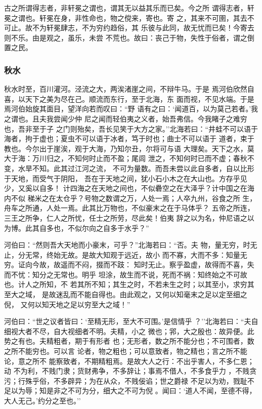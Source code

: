 \documentclass[]{article}
\begin{document}
古之所谓得志者，非轩冕之谓也，谓其无以益其乐而已矣。今之所
谓得志者，轩冕之谓也。轩冕在身，非性命也，物之傥来，寄也。寄
之，其来不可圉，其去不可止。故不为轩冕肆志，不为穷约趋俗，其
乐彼与此同，故无忧而已矣！今寄去则不乐。由是观之，虽乐，未尝
不荒也。故曰：丧己于物，失性于俗者，谓之倒置之民。

\hypertarget{header-n2197}{%
\subsubsection{秋水}\label{header-n2197}}

秋水时至，百川灌河。泾流之大，两涘渚崖之间，不辩牛马。于是
焉河伯欣然自喜，以天下之美为尽在己。顺流而东行，至于北海，东
面而视，不见水端。于是焉河伯始旋其面目，望洋向若而叹曰：``野
语有之曰：`闻道百，以为莫己若者。'我之谓也。且夫我尝闻少仲
尼之闻而轻伯夷之义者，始吾弗信。今我睹子之难穷也，吾非至于子
之门则殆矣，吾长见笑于大方之家。''北海若曰：``井蛙不可以语于海者，拘于虚也；夏虫不可以语于冰者，笃于时也；曲士不可以语于
道者，束于教也。今尔出于崖涘，观于大海，乃知尔丑，尔将可与语
大理矣。天下之水，莫大于海：万川归之，不知何时止而不盈；尾闾
泄之，不知何时已而不虚；春秋不变，水旱不知。此其过江河之流，
不可为量数。而吾未尝以此自多者，自以比形于天地，而受气于阴阳，
吾在于天地之间，犹小石小木之在大山也。方存乎见少，又奚以自多！
计四海之在天地之间也，不似礨空之在大泽乎？计中国之在海内不似
稊米之在太仓乎？号物之数谓之万，人处一焉；人卒九州，谷食之所
生，舟车之所通，人处一焉。此其比万物也，不似豪末之在于马体乎？
五帝之所连，三王之所争，仁人之所忧，任士之所劳，尽此矣！伯夷
辞之以为名，仲尼语之以为博。此其自多也，不似尔向之自多于水乎？''

河伯曰：``然则吾大天地而小豪末，可乎？''北海若曰：``否。夫
物，量无穷，时无止，分无常，终始无故。是故大知观于远近，故小
而不寡，大而不多：知量无穷。证向今故，故遥而不闷，掇而不跂：
知时无止。察乎盈虚，故得而不喜，失而不忧：知分之无常也。明乎
坦涂，故生而不说，死而不祸：知终始之不可故也。计人之所知，不
若其所不知；其生之时，不若未生之时；以其至小，求穷其至大之域，
是故迷乱而不能自得也。由此观之，又何以知毫末之足以定至细之倪，
又何以知天地之足以穷至大之域！''

河伯曰：``世之议者皆曰：`至精无形，至大不可围。'是信情乎
？''北海若曰：``夫自细视大者不尽，自大视细者不明。夫精，小之
微也；郛，大之殷也：故异便。此势之有也。夫精粗者，期于有形者
也；无形者，数之所不能分也；不可围者，数之所不能穷也。可以言
论者，物之粗也；可以意致者，物之精也；言之所不能论，意之所不
能察致者，不期精粗焉。是故大人之行：不出乎害人，不多仁恩；动
不为利，不贱门隶；货财弗争，不多辞让；事焉不借人，不多食乎力
，不贱贪污；行殊乎俗，不多辟异；为在从众，不贱佞谄；世之爵禄
不足以为劝，戮耻不足以为辱；知是非之不可为分，细大之不可为倪
。闻曰：`道人不闻，至德不得，大人无己。'约分之至也。''
\end{document}

